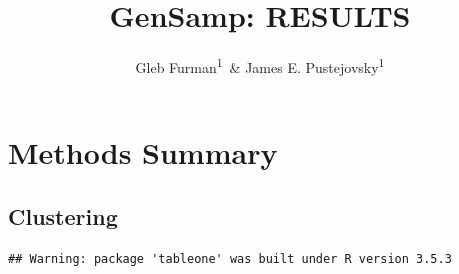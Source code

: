 \documentclass[man,floatsintext]{apa6}
\title{GenSamp: RESULTS}
\author{Gleb Furman\textsuperscript{1}~\& James E. Pustejovsky\textsuperscript{1}}
\date{}
\affiliation{
\vspace{0.5cm}
\textsuperscript{1} University of Texas at Austin}
\begin{document}
\maketitle

\hypertarget{methods-summary}{%
\section{Methods Summary}\label{methods-summary}}

\hypertarget{clustering}{%
\subsection{Clustering}\label{clustering}}

\begin{verbatim}
## Warning: package 'tableone' was built under R version 3.5.3
\end{verbatim}
\end{document}
